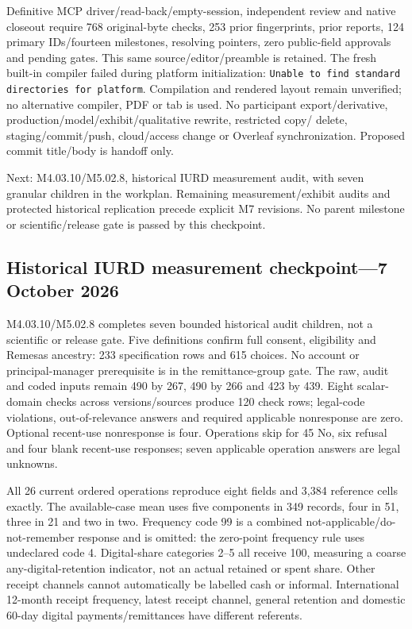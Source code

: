 \documentclass[11pt,a4paper]{article}
\begin{document}
Definitive MCP driver/read-back/empty-session, independent review and native
closeout require 768 original-byte checks, 253 prior fingerprints, prior reports,
124 primary IDs/fourteen milestones, resolving pointers, zero public-field
approvals and pending gates. This same source/editor/preamble is retained.
The fresh built-in compiler failed during platform initialization:
\texttt{Unable to find standard directories for platform}.
Compilation and rendered layout remain unverified; no alternative compiler,
PDF or tab is used. No participant
export/derivative, production/model/exhibit/qualitative rewrite, restricted copy/
delete, staging/commit/push, cloud/access change or Overleaf synchronization.
Proposed commit title/body is handoff only.

Next: M4.03.10/M5.02.8, historical IURD measurement audit, with seven granular
children in the workplan. Remaining measurement/exhibit audits and protected
historical replication precede explicit M7 revisions. No parent milestone or
scientific/release gate is passed by this checkpoint.

\subsection{Historical IURD measurement checkpoint---7 October 2026}
M4.03.10/M5.02.8 completes seven bounded historical audit children, not a
scientific or release gate. Five definitions confirm full consent, eligibility
and Remesas ancestry: 233 specification rows and 615 choices. No account or
principal-manager prerequisite is in the remittance-group gate. The raw,
audit and coded inputs remain 490 by 267, 490 by 266 and 423 by 439.
Eight scalar-domain checks across versions/sources produce 120 check rows;
legal-code violations, out-of-relevance answers and required applicable
nonresponse are zero. Optional recent-use nonresponse is four. Operations
skip for 45 No, six refusal and four blank recent-use responses; seven
applicable operation answers are legal unknowns.

All 26 current ordered operations reproduce eight fields and 3,384 reference
cells exactly. The available-case mean uses five components in 349 records,
four in 51, three in 21 and two in two. Frequency code 99 is a combined
not-applicable/do-not-remember response and is omitted: the zero-point
frequency rule uses undeclared code 4. Digital-share categories 2--5 all
receive 100, measuring a coarse any-digital-retention indicator, not an
actual retained or spent share. Other receipt channels cannot automatically
be labelled cash or informal. International 12-month receipt frequency,
latest receipt channel, general retention and domestic 60-day digital
payments/remittances have different referents.
\end{document}
